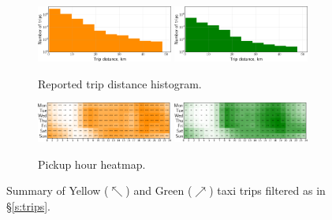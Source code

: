 \documentclass[12pt,notitlepage]{article}
\begin{document}
\begin{figure}[!p]
    \begin{subfigure}{\linewidth}
		\includegraphics[width=0.49\textwidth]{20210610-NYCTLC/e_explore/trip_distance_histogram/yellow_tripdata_2016-05}
		\hfill
		\includegraphics[width=0.49\textwidth]{20210610-NYCTLC/e_explore/trip_distance_histogram/green_tripdata_2016-05}
	
		\caption{Reported trip distance histogram.}
		\label{f:nyctlc-disthist}
	\end{subfigure}
	
	\vspace{\baselineskip}
	
    \begin{subfigure}{\linewidth}
		\includegraphics[width=0.49\textwidth]{20210610-NYCTLC/e_explore/pickup_hour_heatmap/yellow_tripdata_2016-05}
		\hfill
		\includegraphics[width=0.49\textwidth]{20210610-NYCTLC/e_explore/pickup_hour_heatmap/green_tripdata_2016-05}
		
		\caption{Pickup hour heatmap.}
		\label{f:nyctlc-pickup}
	\end{subfigure}
	
		
	\vspace{0.25\baselineskip}%
	\vspace{-0.25\baselineskip}
	
	\caption{%
		Summary 
		of 
		Yellow ($\nwarrow$) and Green ($\nearrow$) taxi trips 
		filtered as in \S\ref{s:trips}.
	}
	\label{f:nyctlc}
\end{figure}
\end{document}
